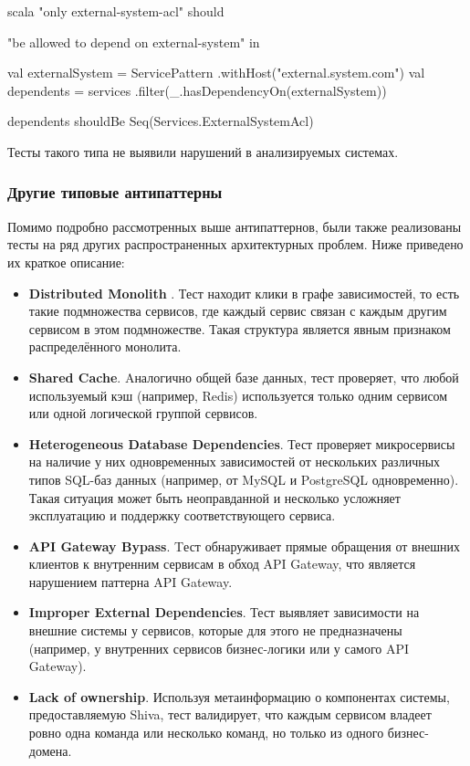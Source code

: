 \begin{code}{scala}
"only external-system-acl" should {
  "be allowed to depend on external-system" in {
    val externalSystem = ServicePattern
      .withHost("external.system.com")
    val dependents = services
      .filter(_.hasDependencyOn(externalSystem))
    
    dependents shouldBe Seq(Services.ExternalSystemAcl)
  }
}
\end{code}

Тесты такого типа не выявили нарушений в анализируемых системах. 

\subsubsection{Другие типовые антипаттерны}

Помимо подробно рассмотренных выше антипаттернов, были также реализованы тесты на ряд других распространенных архитектурных проблем. Ниже приведено их краткое описание:

\begin{itemize}
    \item \textbf{Distributed Monolith} \cite{distr-monolith-ap}. Тест находит клики в графе зависимостей, то есть такие подмножества сервисов, где каждый сервис связан с каждым другим сервисом в этом подмножестве. Такая структура является явным признаком распределённого монолита. 
    \item \textbf{Shared Cache}. Aналогично общей базе данных, тест проверяет, что любой используемый кэш (например, Redis) используется только одним сервисом или одной логической группой сервисов. 
    \item \textbf{Heterogeneous Database Dependencies}. Тест проверяет микросервисы на наличие у них одновременных зависимостей от нескольких различных типов SQL-баз данных (например, от MySQL и PostgreSQL одновременно). Такая ситуация может быть неоправданной и несколько усложняет эксплуатацию и поддержку соответствующего сервиса. 
    \item \textbf{API Gateway Bypass}. Tест обнаруживает прямые обращения от внешних клиентов к внутренним сервисам в обход API Gateway, что является нарушением паттерна API Gateway. 
    \item \textbf{Improper External Dependencies}. Тест выявляет зависимости на внешние системы у сервисов, которые для этого не предназначены (например, у внутренних сервисов бизнес-логики или у самого API Gateway).
    \item \textbf{Lack of ownership}. Используя метаинформацию о компонентах системы, предоставляемую Shiva, тест валидирует, что каждым сервисом владеет ровно одна команда или несколько команд, но только из одного бизнес-домена. 
\end{itemize}

